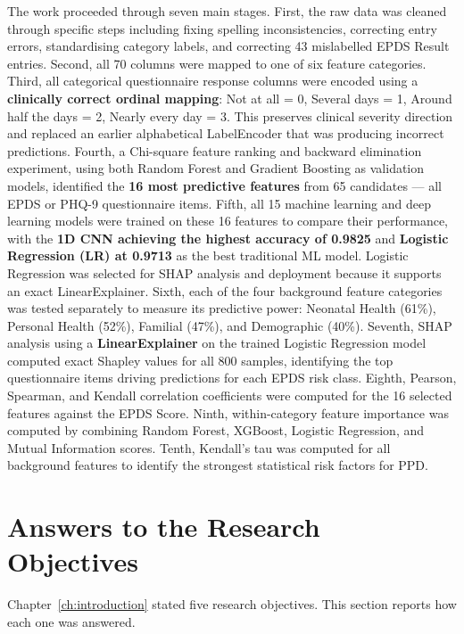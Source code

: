 The work proceeded through seven main stages.
First, the raw data was cleaned through specific steps including fixing spelling inconsistencies, correcting entry errors, standardising category labels, and correcting 43 mislabelled EPDS Result entries.
Second, all 70 columns were mapped to one of six feature categories.
Third, all categorical questionnaire response columns were encoded using a \textbf{clinically correct ordinal mapping}: Not at all = 0, Several days = 1, Around half the days = 2, Nearly every day = 3. This preserves clinical severity direction and replaced an earlier alphabetical LabelEncoder that was producing incorrect predictions.
Fourth, a Chi-square feature ranking and backward elimination experiment, using both Random Forest and Gradient Boosting as validation models, identified the \textbf{16 most predictive features} from 65 candidates --- all EPDS or PHQ-9 questionnaire items.
Fifth, all 15 machine learning and deep learning models were trained on these 16 features to compare their performance, with the \textbf{1D CNN achieving the highest accuracy of 0.9825} and \textbf{Logistic Regression (LR) at 0.9713} as the best traditional ML model. Logistic Regression was selected for SHAP analysis and deployment because it supports an exact LinearExplainer.
Sixth, each of the four background feature categories was tested separately to measure its predictive power: Neonatal Health (61\%), Personal Health (52\%), Familial (47\%), and Demographic (40\%).
Seventh, SHAP analysis using a \textbf{LinearExplainer} on the trained Logistic Regression model computed exact Shapley values for all 800 samples, identifying the top questionnaire items driving predictions for each EPDS risk class.
Eighth, Pearson, Spearman, and Kendall correlation coefficients were computed for the 16 selected features against the EPDS Score.
Ninth, within-category feature importance was computed by combining Random Forest, XGBoost, Logistic Regression, and Mutual Information scores.
Tenth, Kendall's tau was computed for all background features to identify the strongest statistical risk factors for PPD.

\section{Answers to the Research Objectives}
\label{ch5-sec-objectives}

Chapter~\ref{ch:introduction} stated five research objectives.
This section reports how each one was answered.

